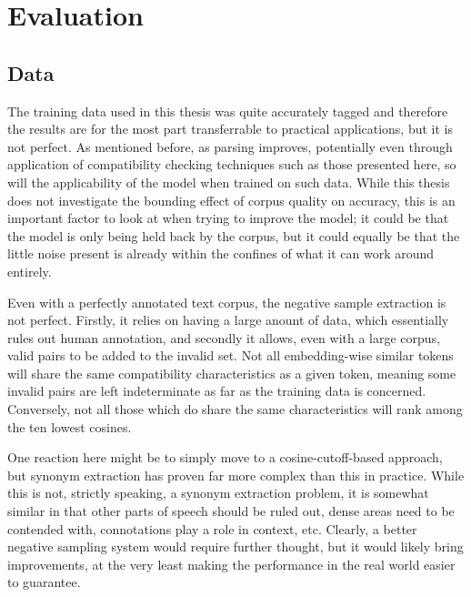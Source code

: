 \documentclass[a4paper, 11pt]{scrartcl}
\begin{document}
\section{Evaluation}

\subsection{Data}
The training data used in this thesis was quite accurately tagged and therefore the results are for the most part transferrable to practical applications, but it is not perfect. As mentioned before, as parsing improves, potentially even through application of compatibility checking techniques such as those presented here, so will the applicability of the model when trained on such data. While this thesis does not investigate the bounding effect of corpus quality on accuracy, this is an important factor to look at when trying to improve the model; it could be that the model is only being held back by the corpus, but it could equally be that the little noise present is already within the confines of what it can work around entirely.

Even with a perfectly annotated text corpus, the negative sample extraction is not perfect. Firstly, it relies on having a large anount of data, which essentially rules out human annotation, and secondly it allows, even with a large corpus, valid pairs to be added to the invalid set. Not all embedding-wise similar tokens will share the same compatibility characteristics as a given token, meaning some invalid pairs are left indeterminate as far as the training data is concerned. Conversely, not all those which do share the same characteristics will rank among the ten lowest cosines.

One reaction here might be to simply move to a cosine-cutoff-based approach, but synonym extraction has proven far more complex than this in practice. While this is not, strictly speaking, a synonym extraction problem, it is somewhat similar in that other parts of speech should be ruled out, dense areas need to be contended with, connotations play a role in context, etc. Clearly, a better negative sampling system would require further thought, but it would likely bring improvements, at the very least making the performance in the real world easier to guarantee.
\end{document}
